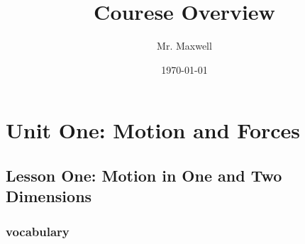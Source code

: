 \documentclass[11pt]{article}
\author{Mr. Maxwell}
\date{\today}
\title{Courese Overview}
\begin{document}
\maketitle
\tableofcontents



\section{Unit One: Motion and Forces}
\label{sec:org2c496fe}

\subsection{Lesson One: Motion in One and Two Dimensions}
\label{sec:orgd035ce7}

\subsubsection{vocabulary}
\label{sec:org67fc6f5}
\end{document}
